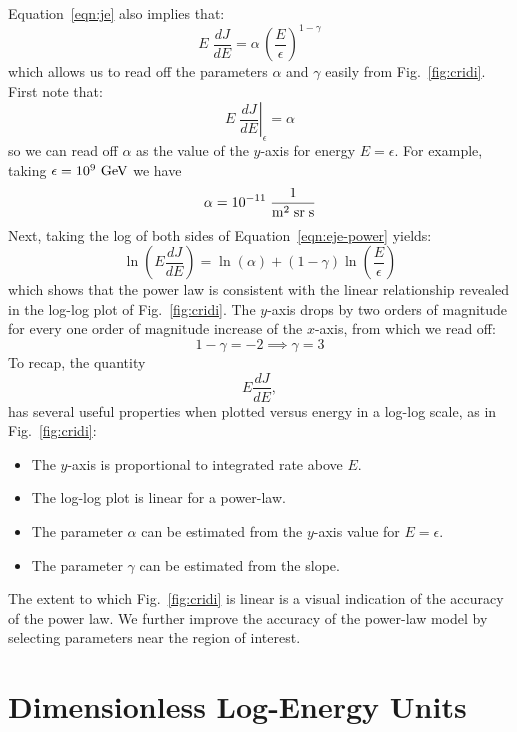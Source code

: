 \documentclass[12pt]{article}
\begin{document}
Equation~\ref{eqn:je} also implies that:
\begin{equation}
\label{eqn:eje-power}
E \; \frac{dJ}{dE} = \alpha \, \left( \frac{E}{\epsilon} \right)^{1-\gamma}
\end{equation}
which allows us to read off the parameters $\alpha$ and $\gamma$
easily from Fig.~\ref{fig:cridi}.  First note that:
$$E \; \left. \frac{dJ}{dE} \right|_\epsilon = \alpha$$
so we can read off $\alpha$ as the value of the $y$-axis for energy $E=\epsilon$.
For example, taking $\epsilon=10^9~\rm GeV$ we have
$$\alpha=10^{-11} \; \frac{1}{\rm m^2 \; sr \; s}$$
Next, taking the log of both sides of Equation~\ref{eqn:eje-power} yields:
\begin{equation}
 \label{eqn:eje-slope}
 \ln \left( E \frac{dJ}{dE} \right) = \ln(\alpha) + (1-\gamma) \ln \left( \frac{E}{\epsilon} \right)
\end{equation}
which shows that the power law is consistent with the linear
relationship revealed in the log-log plot of Fig.~\ref{fig:cridi}.
The $y$-axis drops by two orders of magnitude for every one order of
magnitude increase of the $x$-axis, from which we read off:
$$ 1 - \gamma = -2 \implies \gamma = 3$$
To recap, the quantity
$$E \frac{dJ}{dE},$$
has several useful properties when plotted versus energy in a log-log scale, as in Fig.~\ref{fig:cridi}:
\begin{itemize}
\item The $y$-axis is proportional to integrated rate above $E$.
\item The log-log plot is linear for a power-law.
\item The parameter $\alpha$ can be estimated from the $y$-axis value for $E=\epsilon$.
\item The parameter $\gamma$ can be estimated from the slope.
\end{itemize}
The extent to which Fig.~\ref{fig:cridi} is linear is a visual
indication of the accuracy of the power law.  We further improve the
accuracy of the power-law model by selecting parameters near the
region of interest.

\section{Dimensionless Log-Energy Units}
\end{document}
